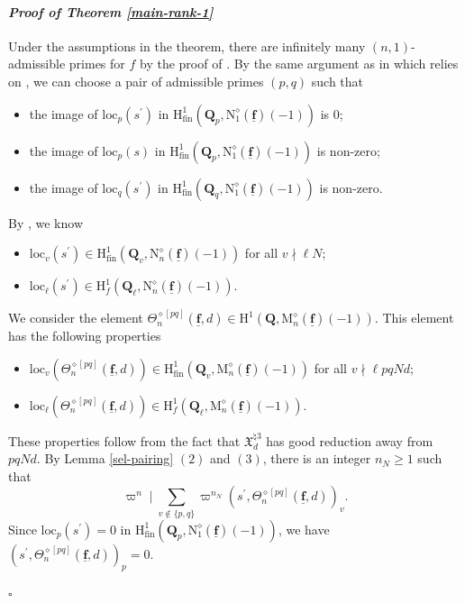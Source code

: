 \documentclass[10pt]{amsart}
\numberwithin{equation}{section}
\theoremstyle{plain}
\numberwithin{equation}{section}
\theoremstyle{definition}
\theoremstyle{remark}
\newenvironment{myproof}[2] {\paragraph{\emph{Proof of {#1} {#2} }}}{\hfill$\square$}
\def\loc{\mathrm{loc}}
\def\interX{\mathfrak{X}}
\def\triplef{\underline{\mathbf{f}}}
\def\QQ{\mathbf{Q}}
\def\rmH{\mathrm{H}}
\def\rmM{\mathrm{M}}
\def\rmN{\mathrm{N}}
\begin{document}
\begin{myproof}{Theorem}{\ref{main-rank-1}}
Under the assumptions in the theorem, there are infinitely many $(n, 1)$-admissible primes for $f$ by the proof of \cite[Theorem 3.2]{BD}. By the same argument as in \cite[Theorem  5.7]{LT} which relies on \cite[Lemma 4.16, Lemma 4.11]{Liu-cubic}, we can choose a pair of admissible primes $(p, q)$ such that 
\begin{itemize}
\item the image of $\loc_{p}(s^{\prime})$ in $\rmH^{1}_{\mathrm{fin}}(\QQ_{p},  \rmN^{\diamond}_{1}(\triplef)(-1))$ is $0$;
\item the image of  $\loc_{p}(s)$ in  $\rmH^{1}_{\mathrm{fin}}(\QQ_{p},  \rmN^{\diamond}_{1}(\triplef)(-1))$ is non-zero;
\item the image of $\loc_{q}(s^{\prime})$ in $\rmH^{1}_{\mathrm{fin}}(\QQ_{q},  \rmN^{\diamond}_{1}(\triplef)(-1))$ is  non-zero.
\end{itemize}
By \cite[Lemma 3.4]{Liu-HZ}, we know
\begin{itemize}
\item $\loc_{v}(s^{\prime})\in \rmH^{1}_{\mathrm{fin}}(\QQ_{v}, \rmN^{\diamond}_{n}(\triplef)(-1))$ for all $v\nmid \ell N$;
\item $\loc_{\ell}(s^{\prime})\in \rmH^{1}_{f}(\QQ_{\ell}, \rmN^{\diamond}_{n}(\triplef)(-1))$. 
\end{itemize} 
We consider the element $\Theta^{\diamond [pq]}_{n}(\triplef, d)\in \rmH^{1}(\QQ, \rmM^{\diamond}_{n}(\triplef)(-1))$. This element has the following properties
\begin{itemize}
\item $\loc_{v}(\Theta^{\diamond[pq]}_{n}(\triplef,d))\in \rmH^{1}_{\mathrm{fin}}(\QQ_{v}, \rmM^{\diamond}_{n}(\triplef)(-1))$ for all $v\nmid \ell pqNd$;
\item $\loc_{\ell}(\Theta^{\diamond[pq]}_{n}(\triplef, d))\in \rmH^{1}_{f}(\QQ_{\ell}, \rmM^{\diamond}_{n}(\triplef)(-1))$.
\end{itemize}
These properties follow from the fact that $\interX^{\natural 3}_{d}$ has good reduction away from $pqNd$. By Lemma \ref{sel-pairing} $(2)$ and $(3)$, there is an integer $n_{N}\geq 1$  such that
\begin{equation}\label{use1}
\varpi^{n}\mid \sum_{v\not\in \{p, q\}} \varpi^{n_{N}}(s^{\prime}, \Theta^{\diamond[pq]}_{n}(\triplef, d))_{v}.
\end{equation}
Since  $\loc_{p}(s^{\prime})=0$ in $\rmH^{1}_{\mathrm{fin}}(\QQ_{p},  \rmN^{\diamond}_{1}(\triplef)(-1))$, we have $(s^{\prime}, \Theta^{\diamond[pq]}_{n}(\triplef,d))_{p}=0$. 

\end{myproof}
\end{document}
